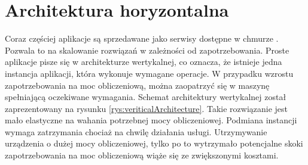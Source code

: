 \section{Architektura horyzontalna}

Coraz częściej aplikacje są sprzedawane jako serwisy dostępne w chmurze \cite{horizontalArchitecture}.
Pozwala to na skalowanie rozwiązań w zależności od zapotrzebowania.
Proste aplikacje pisze się w architekturze wertykalnej, co oznacza, że istnieje jedna instancja aplikacji, która wykonuje wymagane operacje.
W przypadku wzrostu zapotrzebowania na moc obliczeniową, można zaopatrzyć się w maszynę spełniającą oczekiwane wymagania.
Schemat architektury wertykalnej został zaprezentowany na rysunku \ref{rys:veriticalArchitecture}.
Takie rozwiązanie jest mało elastyczne na wahania potrzebnej mocy obliczeniowej.
Podmiana instancji wymaga zatrzymania chociaż na chwilę działania usługi.
Utrzymywanie urządzenia o dużej mocy obliczeniowej, tylko po to wytrzymało potencjalne skoki zapotrzebowania na moc obliczeniową wiąże się ze zwiększonymi kosztami.

\begin{figure}[!hb]
\end{figure}


